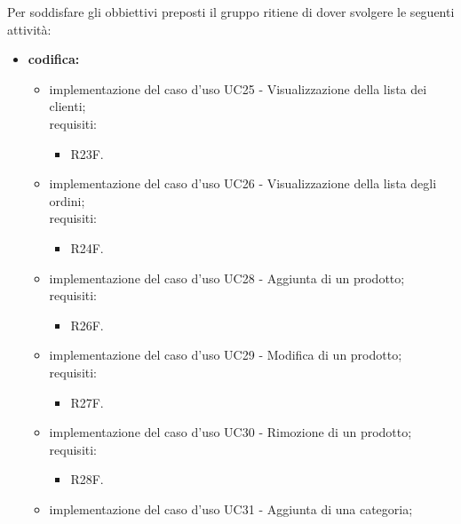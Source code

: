 Per soddisfare gli obbiettivi preposti il gruppo ritiene di dover svolgere le seguenti attività:
\begin{itemize}
    \item \textbf{codifica:}
          \begin{itemize}
              \item implementazione del caso d'uso UC25 - Visualizzazione della lista dei clienti;\\
                    requisiti:
                    \begin{itemize}
                        \item R23F.
                    \end{itemize}
              \item implementazione del caso d'uso UC26 - Visualizzazione della lista degli ordini;\\
                    requisiti:
                    \begin{itemize}
                        \item R24F.
                    \end{itemize}
              \item implementazione del caso d'uso UC28 -  Aggiunta di un prodotto;\\
                    requisiti:
                    \begin{itemize}
                        \item R26F.
                    \end{itemize}
              \item implementazione del caso d'uso UC29 - Modifica di un prodotto;\\
                    requisiti:
                    \begin{itemize}
                        \item R27F.
                    \end{itemize}
              \item implementazione del caso d'uso UC30 - Rimozione di un prodotto;\\
                    requisiti:
                    \begin{itemize}
                        \item R28F.
                    \end{itemize}
              \item implementazione del caso d'uso UC31 -  Aggiunta di una categoria;\\

\end{itemize}
\end{itemize}

